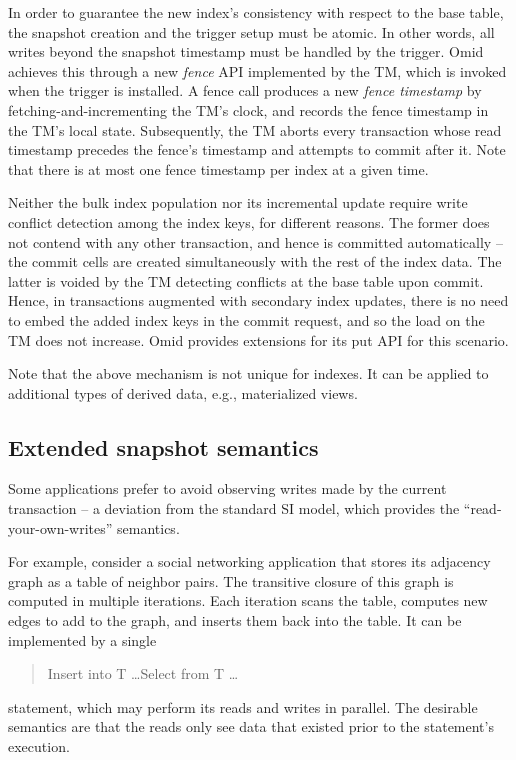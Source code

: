 In order to guarantee the new index's consistency with respect to the base table, the snapshot creation 
and the trigger setup must be atomic. In other words, all writes beyond the snapshot   
timestamp must be handled by the trigger. Omid achieves this through a new {\em fence\/} API
implemented by the TM, which is  invoked when the trigger is installed. 
A fence call produces a new \emph{fence timestamp} by fetching-and-incrementing the TM's clock, and 
records the fence timestamp in the TM's local state.  
Subsequently, the TM aborts every transaction whose read timestamp precedes the fence's 
timestamp and attempts to commit after it. 
Note that there is at most one fence timestamp per index at a given time.



Neither the bulk index population nor its incremental update require write conflict detection 
among the index keys, for different reasons. The former does not contend with any other 
transaction, and hence is committed automatically -- the commit cells are created simultaneously
with the rest of the index data. The latter is voided by the TM detecting conflicts at the base 
table upon commit. Hence, in transactions augmented with secondary index updates,  
there is no need to embed the added index keys in the commit 
request, and so the load on the TM does not increase. 
Omid provides extensions for its put API for this scenario. 

Note that the above mechanism is not unique for indexes. It can be applied to additional types of derived data, 
e.g., materialized views. 

\subsection{Extended snapshot semantics}
\label{ssec:snapshot}

Some applications  prefer to avoid observing  writes made by the current transaction --
a deviation from the standard SI model, which provides the ``read-your-own-writes'' 
semantics. 

For example, consider a social networking application that stores its adjacency graph 
as a table of neighbor pairs. The transitive closure of this graph is computed in
multiple iterations. Each iteration scans the table, computes new edges to add to the 
graph, and inserts them back into the table. It can be implemented by a single 
\begin{quote}
{\sc Insert into T \ldots Select from T \ldots \/} 
\end{quote}
statement, which may perform its reads and writes in parallel. 
The desirable semantics are that the reads only see  data that existed prior to the 
statement's execution. 

